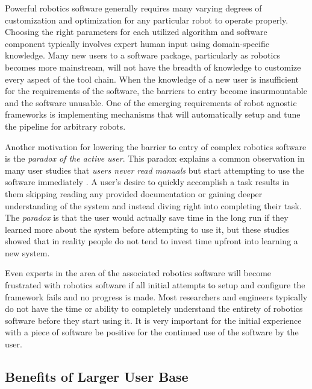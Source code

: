 \documentclass[10pt,journal,compsoc]{joser1}
\begin{document}
{Powerful robotics software generally requires many varying degrees of customization and optimization for any particular robot to operate properly. Choosing the right parameters for each utilized algorithm and software component typically involves expert human input using domain-specific knowledge. Many new users to a software package, particularly as robotics becomes more mainstream, will not have the breadth of knowledge to customize every aspect of the tool chain. When the knowledge of a new user is insufficient for the requirements of the software, the barriers to entry become insurmountable and the software unusable. One of the emerging requirements of robot agnostic frameworks is implementing mechanisms that will automatically setup and tune the pipeline for arbitrary robots.

Another motivation for lowering the barrier to entry of complex robotics software is the \textit{paradox of the active user}. This paradox explains a common observation in many user studies that \textit{users never read manuals} but start attempting to use the software immediately \cite{carroll1987interfacing}. A user's desire to quickly accomplish a task results in them skipping reading any provided documentation or gaining deeper understanding of the system and instead diving right into completing their task. The \textit{paradox} is that the user would actually save time in the long run if they learned more about the system before attempting to use it, but these studies showed that in reality people do not tend to invest time upfront into learning a new system.

Even experts in the area of the associated robotics software will become frustrated with robotics software if all initial attempts to setup and configure the framework fails and no progress is made. Most researchers and engineers typically do not have the time or ability to completely understand the entirety of robotics software before they start using it. It is very important for the initial experience with a piece of software be positive for the continued use of the software by the user.

\subsection{Benefits of Larger User Base}

}
\end{document}
